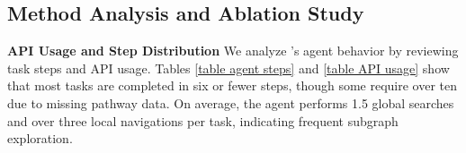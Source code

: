 \subsection{Method Analysis and Ablation Study}



\textbf{API Usage and Step Distribution} We analyze \modelname's agent behavior by reviewing task steps and API usage. Tables \ref{table agent steps} and \ref{table API usage} show that most tasks are completed in six or fewer steps, though some require over ten due to missing pathway data. On average, the agent performs 1.5 global searches and over three local navigations per task, indicating frequent subgraph exploration.








